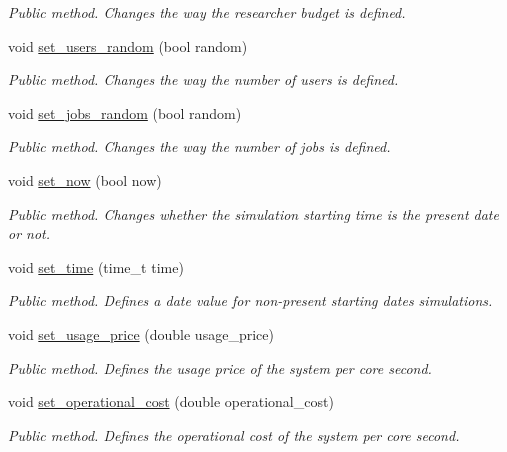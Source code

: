 \begin{DoxyCompactItemize}
\begin{DoxyCompactList}\small\item\em Public method. Changes the way the researcher budget is defined. \end{DoxyCompactList}\item 
void \hyperlink{classConfiguration_aedf812b154b8cc8b3db322f6d969ca59}{set\+\_\+users\+\_\+random} (bool random)
\begin{DoxyCompactList}\small\item\em Public method. Changes the way the number of users is defined. \end{DoxyCompactList}\item 
void \hyperlink{classConfiguration_acd24051b1759e61132d6653e0df9dfe4}{set\+\_\+jobs\+\_\+random} (bool random)
\begin{DoxyCompactList}\small\item\em Public method. Changes the way the number of jobs is defined. \end{DoxyCompactList}\item 
void \hyperlink{classConfiguration_a1d5547d2f203074882e1d6d3c5ddbb8a}{set\+\_\+now} (bool now)
\begin{DoxyCompactList}\small\item\em Public method. Changes whether the simulation starting time is the present date or not. \end{DoxyCompactList}\item 
void \hyperlink{classConfiguration_a7d9e089372333b0c1ec93c7fdbd297f2}{set\+\_\+time} (time\+\_\+t time)
\begin{DoxyCompactList}\small\item\em Public method. Defines a date value for non-\/present starting dates simulations. \end{DoxyCompactList}\item 
void \hyperlink{classConfiguration_a0b9459ad48edbac60dcd8962910653a2}{set\+\_\+usage\+\_\+price} (double usage\+\_\+price)
\begin{DoxyCompactList}\small\item\em Public method. Defines the usage price of the system per core second. \end{DoxyCompactList}\item 
void \hyperlink{classConfiguration_a31284f3adcd959a1092a27efb5742452}{set\+\_\+operational\+\_\+cost} (double operational\+\_\+cost)
\begin{DoxyCompactList}\small\item\em Public method. Defines the operational cost of the system per core second. \end{DoxyCompactList}\item 

\end{DoxyCompactItemize}
